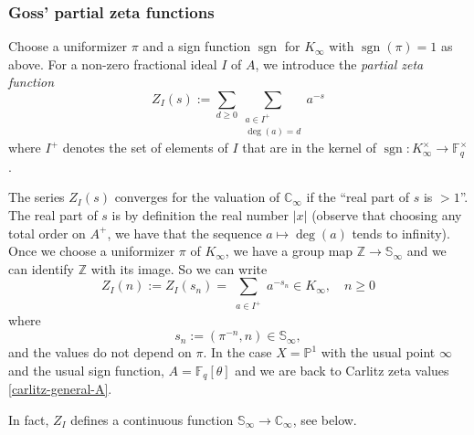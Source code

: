 \documentclass[11pt]{amsart}
\numberwithin{equation}{section}
\newcommand{\ZZ}{\mathbb{Z}}
\newcommand{\FF}{\mathbb{F}}
\newcommand{\CC}{\mathbb{C}}
\newcommand{\PP}{\mathbb{P}}
\newcommand{\sgn}{\operatorname{sgn}}
\begin{document}
\subsubsection{Goss' partial zeta functions}\label{Goss-partial-zeta}
Choose a uniformizer $\pi$ and a sign function $\sgn$ for $K_\infty$ with $\sgn(\pi)=1$ as above. 
For a non-zero fractional ideal $I$ of $A$, we introduce the {\em partial zeta function}
\begin{equation}\label{definition-partial-zeta}
Z_I(s):=\sum_{d\geq 0}\sum_{\begin{smallmatrix}a\in I^+\\ \deg(a)=d\end{smallmatrix}}a^{-s}
\end{equation}
where $I^+$ denotes the set of elements of $I$ that are in the kernel of $\sgn:K_\infty^\times\rightarrow\FF_q^\times$.

The series $Z_I(s)$ converges for the valuation of $\CC_\infty$ if the ``real part of $s$ is $>1$''. The real part of $s$ is by definition the real number $|x|$ (observe that choosing any total order on $A^+$, we have that the sequence $a\mapsto \deg(a)$
tends to infinity). 
Once we choose a uniformizer $\pi$ of $K_\infty$, we have a group map $\ZZ\rightarrow\mathbb{S}_\infty$ and we can identify $\ZZ$ with its image. So we can write
\begin{equation}\label{goss-partial-zeta}
Z_I(n):=Z_I(s_n)=\sum_{\begin{smallmatrix}a\in I^+\end{smallmatrix}}a^{-s_n}\in K_\infty, \quad n\geq0
\end{equation}
where
\begin{equation}\label{definition-sn}
s_n:=(\pi^{-n},n)\in\mathbb{S}_\infty,
\end{equation}
and the values do not depend on $\pi$.  In the case $X=\PP^1$ with 
the usual point $\infty$ and the usual sign function, $A=\FF_q[\theta]$ and we are back to Carlitz zeta values \eqref{carlitz-general-A}. 

In fact, $Z_I$ defines a continuous function $\mathbb{S}_\infty\rightarrow\CC_\infty$, see below.
\end{document}
